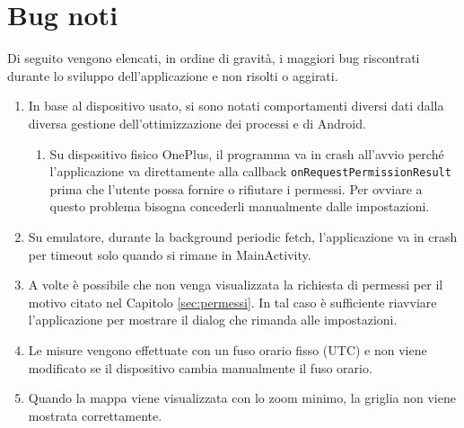 \documentclass[11pt]{article}
\begin{document}
\section{Bug noti}
Di seguito vengono elencati, in ordine di gravità, i maggiori bug riscontrati durante lo sviluppo dell'applicazione e non risolti o aggirati.
\begin{enumerate}
    \item In base al dispositivo usato, si sono notati comportamenti diversi dati dalla diversa gestione dell'ottimizzazione dei processi e di Android.
    \begin{enumerate}
        \item Su dispositivo fisico OnePlus, il programma va in crash all'avvio perché l'applicazione va direttamente alla callback \texttt{onRequestPermissionResult} prima che l'utente possa fornire o rifiutare i permessi. Per ovviare a questo problema bisogna concederli manualmente dalle impostazioni.
    \end{enumerate}
    \item Su emulatore, durante la background periodic fetch, l'applicazione va in crash per timeout solo quando si rimane in MainActivity.
    \item A volte è possibile che non venga visualizzata la richiesta di permessi per il motivo citato nel Capitolo \ref{sec:permessi}. In tal caso è sufficiente riavviare l'applicazione per mostrare il dialog che rimanda alle impostazioni.
    \item Le misure vengono effettuate con un fuso orario fisso (UTC) e non viene modificato se il dispositivo cambia manualmente il fuso orario.
    \item Quando la mappa viene visualizzata con lo zoom minimo, la griglia non viene mostrata correttamente.
\end{enumerate}
\end{document}
